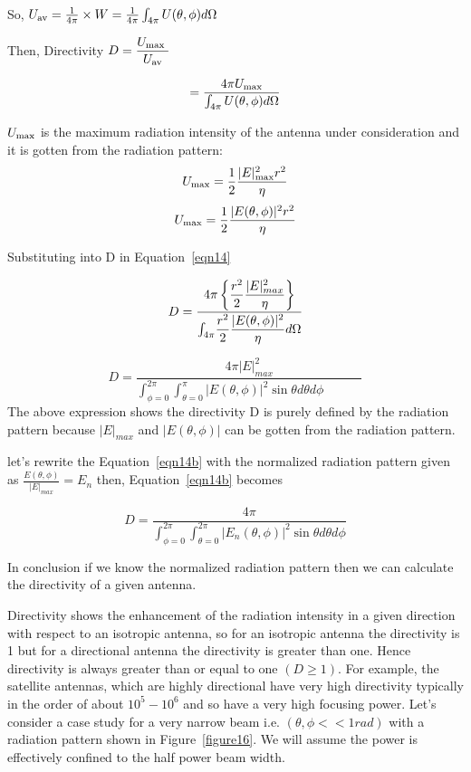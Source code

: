 \begin{enumerate}
So, $U_{\textnormal{av}}=\frac{1}{4\pi} \times W = \frac{1}{4\pi}\int_{4\pi}U(\theta ,\phi)d\Omega$

Then, Directivity $D=\dfrac{U_{\textnormal{max
}}}{U_{\textnormal{av}}}$ 

\begin{equation}
= \frac{4\pi U_{\textnormal{max}}}{\int_{4\pi}U(\theta,\phi)d\Omega}
\label{eqn14}
\end{equation}

$U_{\textnormal{max}}$ is the maximum radiation intensity of the antenna under consideration and it is gotten from the radiation pattern:
$$U_{\textnormal{max}}=\frac{1}{2}\frac{|E|^{2}_{\textnormal{max}}r^{2}}{\eta}$$
$$U_{\textnormal{max}}=\frac{1}{2}\frac{|E(\theta,\phi)|^{2}r^{2}}{\eta}$$

Substituting into D in Equation~\ref{eqn14}

$$
D = \dfrac{4\pi\left\{\dfrac{r^2}{2}
	\dfrac{|E|^2_{max}}{\eta}\right\}}
{{\Large \int_{4\pi}}\dfrac{r^2}{2}
	\dfrac{|E(\theta,\phi)|^2}{\eta}d\Omega }
$$

\begin{equation}
D = \dfrac{4\pi|E|^2_{max}}{\int^{ 2\pi}_{\phi=0}\int^{ \pi}_{\theta=0}|E(\theta,\phi)|^2\sin\theta d\theta d\phi \qquad \quad}
\label{eqn14b}
\end{equation}
The above expression shows the directivity D is purely defined by the radiation pattern because $|E|_{max}$ and $|E(\theta, \phi)|$ can be gotten from the radiation pattern.

let's rewrite the Equation~\ref{eqn14b} with the normalized radiation pattern given as $\frac{E(\theta, \phi)}{|E|_{max}} = E_n$ then, Equation~\ref{eqn14b} becomes

\begin{equation}
D = \frac{4\pi}{\int_{\phi = 0}^{2\pi}\int_{\theta = 0}^{2\pi}|E_n(\theta, \phi)|^2\sin\theta d\theta d\phi}
\label{eqn14c}
\end{equation}

In conclusion if we know the normalized radiation pattern then we can calculate the directivity of a given antenna.
		
Directivity shows the enhancement of the radiation intensity in a given direction with respect to an isotropic antenna, so for an isotropic antenna the directivity is 1 but for a directional antenna the directivity is greater than one. Hence directivity is always greater than or equal to one $(D\geq 1)$.
For example, the satellite antennas, which are highly directional have very high directivity typically in the order of about $10^{5}-10^{6}$ and so have a very high focusing power.	Let's consider a case study for a very narrow beam i.e. $(\theta, \phi << 1rad)$ with a radiation pattern shown in Figure~\ref{figure16}. We will assume the power is effectively confined to the half power beam width.  


\end{enumerate}
